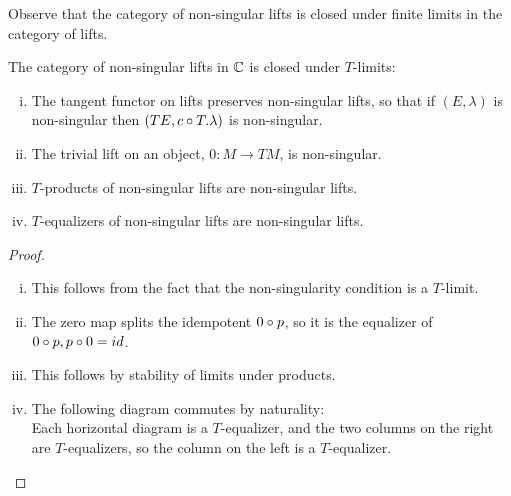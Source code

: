 Observe that the category of non-singular lifts is closed under finite limits in the category of lifts.
\begin{proposition}%
  \label{prop:nonsing-closed-under-t-limits}
  The category of non-singular lifts in $\mathbb{C}$ is closed under $T$-limits:
  \begin{enumerate}[(i)]
    \item The tangent functor on lifts preserves non-singular lifts, so that if $(E,\lambda)$ is non-singular then $(TE,c\circ T.\lambda)$ is non-singular. 
    \item The trivial lift on an object, $0:M \to TM$, is non-singular. 
    \item $T$-products of non-singular lifts are non-singular lifts.
    \item $T$-equalizers of non-singular lifts are non-singular lifts.
  \end{enumerate}
\end{proposition}
\begin{proof}
  ~\begin{enumerate}[(i)]
    \item This follows from the fact that the non-singularity condition is a $T$-limit.
    \item The zero map splits the idempotent $0 \circ p$, so it is the equalizer of $0 \circ p, p \circ 0 = id$.
    \item This follows by stability of limits under products.
    \item The following diagram commutes by naturality:
    \[\]
    Each horizontal diagram is a $T$-equalizer, and the two columns on the right are $T$-equalizers, so the column on the left is a $T$-equalizer.
  \end{enumerate}
\end{proof}


